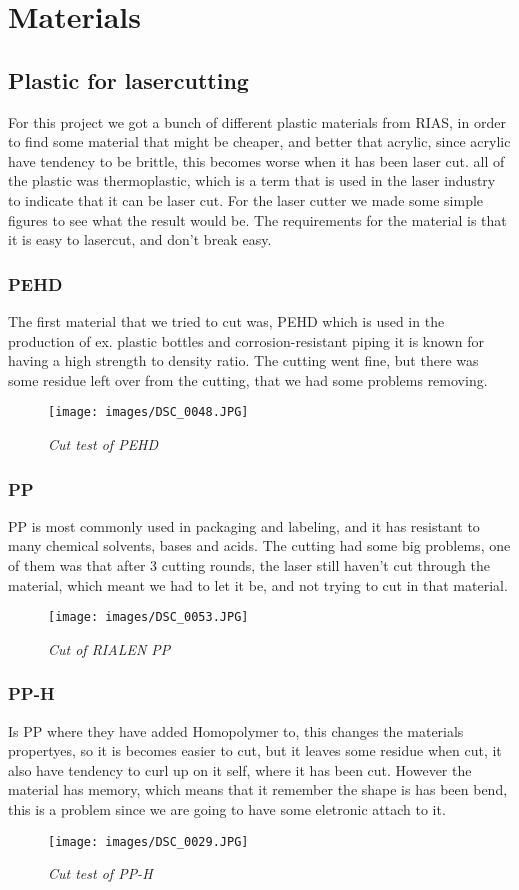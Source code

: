 \section{Materials}
\subsection{Plastic for lasercutting}
For this project we got a bunch of different plastic materials from RIAS, in order to find some material that might be cheaper, and better that acrylic, since acrylic have tendency to be brittle, this becomes worse when it has been laser cut.
all of the plastic was thermoplastic, which is a term that is used in the laser industry to indicate that it can be laser cut.
For the laser cutter we made some simple figures to see what the result would be.
The requirements for the material is that it is easy to lasercut, and don't break easy.
\subsubsection{PEHD}
The first material that we tried to cut was, PEHD which is used in the production of ex. plastic bottles and corrosion-resistant piping it is known for having a high strength to density ratio.
The cutting went fine, but there was some residue left over from the cutting, that we had some problems removing.
\begin{figure}[!h]
	\centering
	\texttt{[image: images/DSC\_0048.JPG]}
	\caption{\small {\it {Cut test of PEHD}}} \label{fig:PEHD}
\end{figure}
\FloatBarrier
\subsubsection{ PP}
 PP is most commonly used in packaging and labeling, and it has resistant to many chemical solvents, bases and acids.
The cutting had some big problems, one of them was that after 3 cutting rounds, the laser still haven't cut through the material, which meant we had to let it be, and not trying to cut in that material.
\begin{figure}[!h]
	\centering
	\texttt{[image: images/DSC\_0053.JPG]}
	\caption{\small {\it {Cut of RIALEN PP}}} \label{fig:PP}
\end{figure}
\FloatBarrier
\subsubsection{PP-H}
Is PP where they have added Homopolymer to, this changes the materials propertyes, so it is becomes easier to cut, but it leaves some residue when cut, it also have tendency to curl up on it self, where it has been cut.
However the material has memory, which means that it remember the shape is has been bend, this is a problem since we are going to have some eletronic attach to it.
\begin{figure}[!h]
	\centering
	\texttt{[image: images/DSC\_0029.JPG]}
	\caption{\small {\it {Cut test of PP-H}}} \label{fig:PP-H}
\end{figure}
\FloatBarrier
